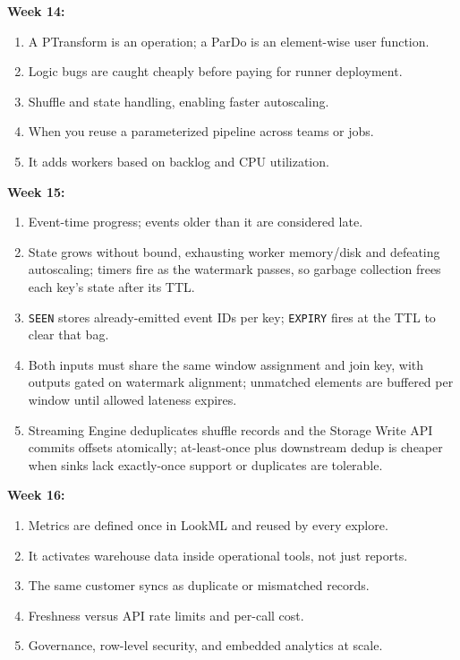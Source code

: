 \documentclass[11pt, a4paper]{article}
\begin{document}
\textbf{Week 14:}
\begin{enumerate}[nosep, leftmargin=1.5em]
    \item A PTransform is an operation; a ParDo is an element-wise user function.
    \item Logic bugs are caught cheaply before paying for runner deployment.
    \item Shuffle and state handling, enabling faster autoscaling.
    \item When you reuse a parameterized pipeline across teams or jobs.
    \item It adds workers based on backlog and CPU utilization.
\end{enumerate}

\textbf{Week 15:}
\begin{enumerate}[nosep, leftmargin=1.5em]
    \item Event-time progress; events older than it are considered late.
    \item State grows without bound, exhausting worker memory/disk and defeating autoscaling; timers fire as the watermark passes, so garbage collection frees each key's state after its TTL.
    \item \texttt{SEEN} stores already-emitted event IDs per key; \texttt{EXPIRY} fires at the TTL to clear that bag.
    \item Both inputs must share the same window assignment and join key, with outputs gated on watermark alignment; unmatched elements are buffered per window until allowed lateness expires.
    \item Streaming Engine deduplicates shuffle records and the Storage Write API commits offsets atomically; at-least-once plus downstream dedup is cheaper when sinks lack exactly-once support or duplicates are tolerable.
\end{enumerate}

\textbf{Week 16:}
\begin{enumerate}[nosep, leftmargin=1.5em]
    \item Metrics are defined once in LookML and reused by every explore.
    \item It activates warehouse data inside operational tools, not just reports.
    \item The same customer syncs as duplicate or mismatched records.
    \item Freshness versus API rate limits and per-call cost.
    \item Governance, row-level security, and embedded analytics at scale.
\end{enumerate}
\end{document}
